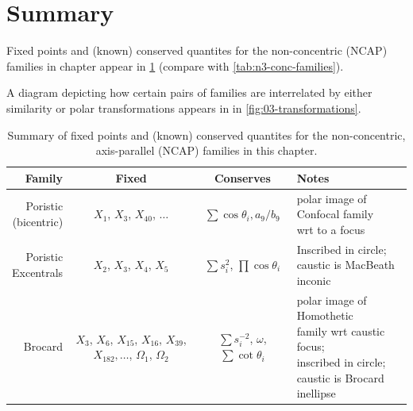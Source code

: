 \section{Summary}

Fixed points and (known) conserved quantites for the non-concentric (NCAP) families in chapter appear in
\cref{tab:n3-non-conc-families} (compare with 
\cref{tab:n3-conc-families}).

A diagram depicting how certain pairs of families are interrelated by either similarity or polar transformations appears in in \cref{fig:03-transformations}.

\begin{table}
\centering
\begin{tabular}{|r|c|c|l|}
\hline
Family & Fixed & Conserves & Notes \\
\hline
\makecell[rc]{Poristic\\(bicentric)} & $X_1$, $X_3$, $X_{40}$, $\ldots$ & $\sum\cos\theta_i,a_9/b_9$ & \makecell[lc]{polar image of Confocal family\\wrt to a focus} \\
\hline
\makecell[rt]{Poristic\\Excentrals} & $X_2$, $X_3$, $X_4$, $X_5$ & $\sum{s_i^2}$, $\prod\cos\theta_i$ & \makecell[lt]{Inscribed in circle;\\caustic is MacBeath inconic} \\
\hline
Brocard & \makecell[lc]{$X_3$, $X_6$, $X_{15}$, $X_{16}$,\\$X_{39}$, $X_{182},\ldots$,\\$\Omega_1$, $\Omega_2$} & $\sum{s_i^{-2}}$, $\omega$, $\sum\cot\theta_i$ & \makecell[lc]{polar image of Homothetic\\family wrt caustic focus;\\inscribed in circle;\\caustic is Brocard inellipse}\\
\hline
\end{tabular}
\caption{Summary of fixed points and (known) conserved quantites for the non-concentric, axis-parallel (NCAP) families in this chapter.}
\label{tab:n3-non-conc-families}
\end{table}

